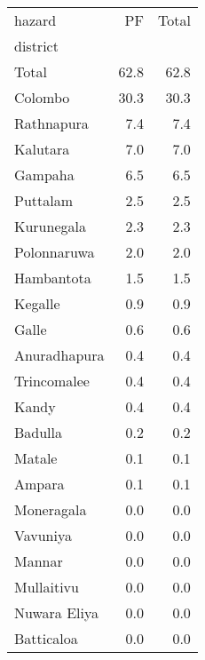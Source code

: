 \begin{tabular}{lrr}
\toprule
hazard &    PF &  Total \\
district     &       &        \\
\midrule
Total        &  62.8 &   62.8 \\
Colombo      &  30.3 &   30.3 \\
Rathnapura   &   7.4 &    7.4 \\
Kalutara     &   7.0 &    7.0 \\
Gampaha      &   6.5 &    6.5 \\
Puttalam     &   2.5 &    2.5 \\
Kurunegala   &   2.3 &    2.3 \\
Polonnaruwa  &   2.0 &    2.0 \\
Hambantota   &   1.5 &    1.5 \\
Kegalle      &   0.9 &    0.9 \\
Galle        &   0.6 &    0.6 \\
Anuradhapura &   0.4 &    0.4 \\
Trincomalee  &   0.4 &    0.4 \\
Kandy        &   0.4 &    0.4 \\
Badulla      &   0.2 &    0.2 \\
Matale       &   0.1 &    0.1 \\
Ampara       &   0.1 &    0.1 \\
Moneragala   &   0.0 &    0.0 \\
Vavuniya     &   0.0 &    0.0 \\
Mannar       &   0.0 &    0.0 \\
Mullaitivu   &   0.0 &    0.0 \\
Nuwara Eliya &   0.0 &    0.0 \\
Batticaloa   &   0.0 &    0.0 \\
\bottomrule
\end{tabular}
